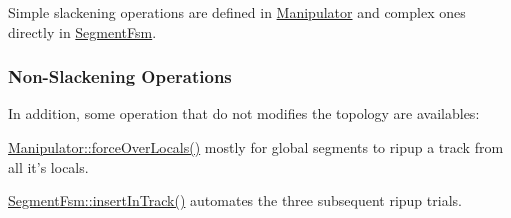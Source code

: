 Simple slackening operations are defined in \hyperlink{classKite_1_1Manipulator}{Manipulator} and complex ones directly in \hyperlink{classKite_1_1SegmentFsm}{Segment\-Fsm}.\hypertarget{classKite_1_1SegmentFsm_secNonSlackening}{}\subsubsection{Non-\/\-Slackening Operations}\label{classKite_1_1SegmentFsm_secNonSlackening}
In addition, some operation that do not modifies the topology are availables\-:
\begin{DoxyEnumerate}
\item \hyperlink{classKite_1_1Manipulator_add26b688d75a99a1ae781787eead08d5}{Manipulator\-::force\-Over\-Locals()} mostly for global segments to ripup a track from all it's locals.
\item \hyperlink{classKite_1_1SegmentFsm_a7140b507da2cab137d968a037bed19df}{Segment\-Fsm\-::insert\-In\-Track()} automates the three subsequent ripup trials. 
\end{DoxyEnumerate}

